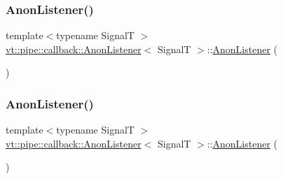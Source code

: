 \subsubsection{\texorpdfstring{Anon\+Listener()}{AnonListener()}\hspace{0.1cm}{\footnotesize\ttfamily [1/5]}}
{\footnotesize\ttfamily template$<$typename SignalT $>$ \\
\hyperlink{structvt_1_1pipe_1_1callback_1_1_anon_listener}{vt\+::pipe\+::callback\+::\+Anon\+Listener}$<$ SignalT $>$\+::\hyperlink{structvt_1_1pipe_1_1callback_1_1_anon_listener}{Anon\+Listener} (\begin{DoxyParamCaption}{ }\end{DoxyParamCaption})\hspace{0.3cm}{\ttfamily [default]}}

\mbox{\label{structvt_1_1pipe_1_1callback_1_1_anon_listener_aa118ce8196dc5ae4bcce9c076c13fe96}} 
\subsubsection{\texorpdfstring{Anon\+Listener()}{AnonListener()}\hspace{0.1cm}{\footnotesize\ttfamily [2/5]}}
{\footnotesize\ttfamily template$<$typename SignalT $>$ \\
\hyperlink{structvt_1_1pipe_1_1callback_1_1_anon_listener}{vt\+::pipe\+::callback\+::\+Anon\+Listener}$<$ SignalT $>$\+::\hyperlink{structvt_1_1pipe_1_1callback_1_1_anon_listener}{Anon\+Listener} (\begin{DoxyParamCaption}\item[{\hyperlink{structvt_1_1pipe_1_1callback_1_1_anon_listener}{Anon\+Listener}$<$ SignalT $>$ const \&}]{ }\end{DoxyParamCaption})\hspace{0.3cm}{\ttfamily [default]}}

\mbox{\label{structvt_1_1pipe_1_1callback_1_1_anon_listener_aa6d501a31dc807d01a6b71bc2011e90d}} 
